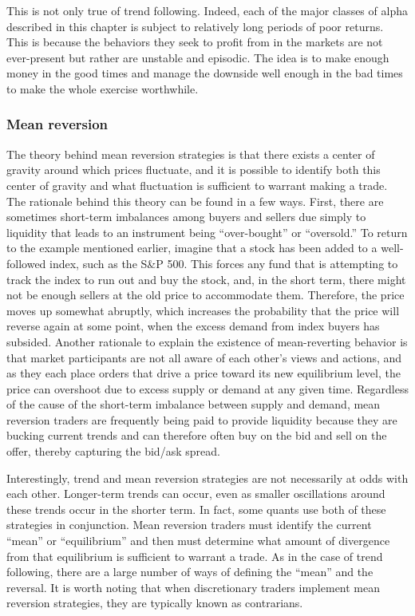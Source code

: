 \documentclass[11pt]{report}
\begin{document}
					This is not only true of trend following. Indeed, each of the major classes of alpha described in this chapter is subject to relatively long periods of poor returns. This is because the behaviors they seek to profit from in the markets are not ever-present but rather are unstable and episodic. The idea is to make enough money in the good times and manage the downside well enough in the bad times to make the whole exercise worthwhile.

				\subsubsection{Mean reversion}

					The theory behind mean reversion strategies is that there exists a center of gravity around which prices fluctuate, and it is possible to identify both this center of gravity and what fluctuation is sufficient to warrant making a trade. The rationale behind this theory can be found in a few ways. First, there are sometimes short-term imbalances among buyers and sellers due simply to liquidity that leads to an instrument being ``over-bought'' or ``oversold.'' To return to the example mentioned earlier, imagine that a stock has been added to a well-followed index, such as the S\&P 500. This forces any fund that is attempting to track the index to run out and buy the stock, and, in the short term, there might not be enough sellers at the old price to accommodate them. Therefore, the price moves up somewhat abruptly, which increases the probability that the price will reverse again at some point, when the excess demand from index buyers has subsided. Another rationale to explain the existence of mean-reverting behavior is that market participants are not all aware of each other's views and actions, and as they each place orders that drive a price toward its new equilibrium level, the price can overshoot due to excess supply or demand at any given time. Regardless of the cause of the short-term imbalance between supply and demand, mean reversion traders are frequently being paid to provide liquidity because they are bucking current trends and can therefore often buy on the bid and sell on the offer, thereby capturing the bid/ask spread.

					Interestingly, trend and mean reversion strategies are not necessarily at odds with each other. Longer-term trends can occur, even as smaller oscillations around these trends occur in the shorter term. In fact, some quants use both of these strategies in conjunction. Mean reversion traders must identify the current ``mean'' or ``equilibrium'' and then must determine what amount of divergence from that equilibrium is sufficient to warrant a trade. As in the case of trend following, there are a large number of ways of defining the ``mean'' and the reversal. It is worth noting that when discretionary traders implement mean reversion strategies, they are typically known as contrarians.
\end{document}
